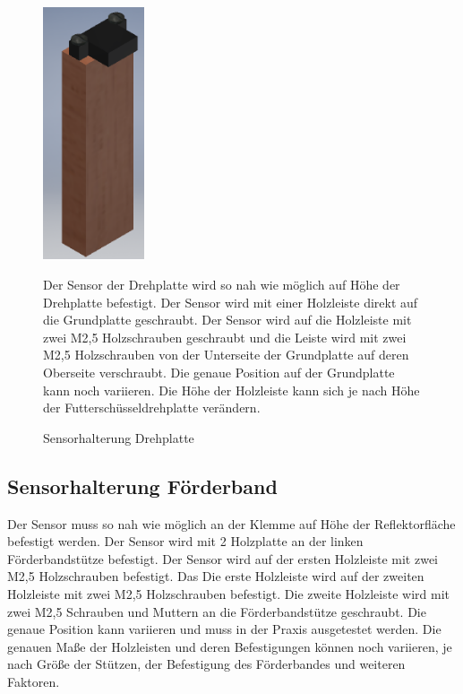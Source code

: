 \begin{figure}[H]
\begin{minipage}[t]{6cm}
\vspace{0pt}
\centering
\includegraphics[width=3cm]{Bilder/Inventor/Sensorhalterung_Drehplatte}
\caption{Sensorhalterung Drehplatte}
\label{Sens_Dreh}
\end{minipage}
\hfill
\begin{minipage}[t]{12cm}
\vspace{0pt}
Der Sensor der Drehplatte wird so nah wie möglich auf Höhe der Drehplatte befestigt. Der Sensor wird mit einer Holzleiste direkt auf die Grundplatte geschraubt. Der Sensor wird auf die Holzleiste mit zwei M2,5 Holzschrauben geschraubt und die Leiste wird mit zwei M2,5 Holzschrauben von der Unterseite der Grundplatte auf deren Oberseite verschraubt. Die genaue Position auf der Grundplatte kann noch variieren. Die Höhe der Holzleiste kann sich je nach Höhe der Futterschüsseldrehplatte verändern.
\end{minipage}
\end{figure}
\subsection{Sensorhalterung Förderband}
Der Sensor muss so nah wie möglich an der Klemme auf Höhe der Reflektorfläche befestigt werden. Der Sensor wird mit 2 Holzplatte an der linken Förderbandstütze befestigt. Der Sensor wird auf der ersten Holzleiste mit zwei M2,5 Holzschrauben befestigt. Das Die erste Holzleiste wird auf der zweiten Holzleiste mit zwei M2,5 Holzschrauben befestigt. Die zweite Holzleiste wird mit zwei M2,5 Schrauben und Muttern an die Förderbandstütze geschraubt. Die genaue Position kann variieren und muss in der Praxis ausgetestet werden. Die genauen Maße der Holzleisten und deren Befestigungen können noch variieren, je nach Größe der Stützen, der Befestigung des Förderbandes und weiteren Faktoren.

